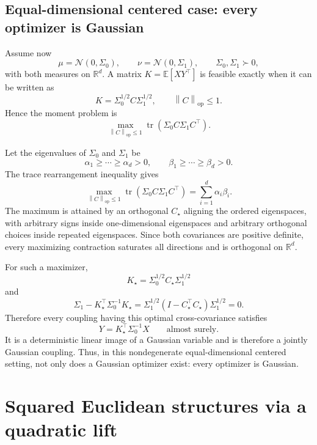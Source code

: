 \documentclass[11pt]{article}
\newcommand{\R}{\mathbb{R}}
\newcommand{\E}{\mathbb{E}}
\newcommand{\norm}[1]{\left\lVert #1\right\rVert}
\newcommand{\tr}{\operatorname{tr}}
\begin{document}
\subsection{Equal-dimensional centered case: every optimizer is Gaussian}

Assume now
\[
\mu=\mathcal N(0,\Sigma_0),
\qquad
\nu=\mathcal N(0,\Sigma_1),
\qquad
\Sigma_0,\Sigma_1\succ0,
\]
with both measures on $\R^d$. A matrix $K=\E[XY^\top]$ is feasible exactly
when it can be written as
\[
K=\Sigma_0^{1/2}C\Sigma_1^{1/2},
\qquad
\norm{C}_{\mathrm{op}}\leq1.
\]
Hence the moment problem is
\[
\max_{\norm{C}_{\mathrm{op}}\leq1}
\tr\!\left(\Sigma_0 C\Sigma_1 C^\top\right).
\]

Let the eigenvalues of $\Sigma_0$ and $\Sigma_1$ be
\[
\alpha_1\geq\cdots\geq\alpha_d>0,
\qquad
\beta_1\geq\cdots\geq\beta_d>0.
\]
The trace rearrangement inequality gives
\[
\max_{\norm{C}_{\mathrm{op}}\leq1}
\tr\!\left(\Sigma_0 C\Sigma_1 C^\top\right)
=
\sum_{i=1}^d\alpha_i\beta_i.
\]
The maximum is attained by an orthogonal $C_\star$ aligning the ordered
eigenspaces, with arbitrary signs inside one-dimensional eigenspaces and
arbitrary orthogonal choices inside repeated eigenspaces. Since both
covariances are positive definite, every maximizing contraction saturates
all directions and is orthogonal on $\R^d$.

For such a maximizer,
\[
K_\star=\Sigma_0^{1/2}C_\star\Sigma_1^{1/2}
\]
and
\[
\Sigma_1-K_\star^\top\Sigma_0^{-1}K_\star
=
\Sigma_1^{1/2}(I-C_\star^\top C_\star)\Sigma_1^{1/2}
=0.
\]
Therefore every coupling having this optimal cross-covariance satisfies
\[
Y=K_\star^\top\Sigma_0^{-1}X
\qquad\text{almost surely}.
\]
It is a deterministic linear image of a Gaussian variable and is therefore
a jointly Gaussian coupling. Thus, in this nondegenerate equal-dimensional
centered setting, not only does a Gaussian optimizer exist: every optimizer
is Gaussian.

\section{Squared Euclidean structures via a quadratic lift}
\end{document}

